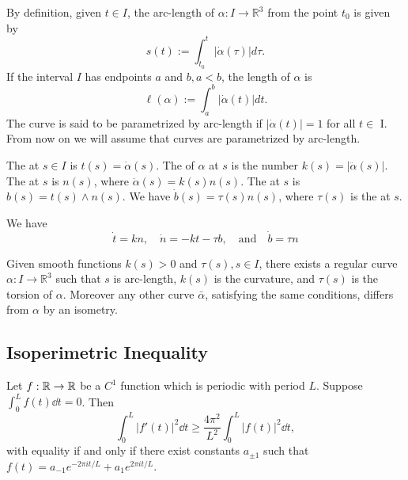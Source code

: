 \documentclass[10pt]{article}
\begin{document}
By definition, given $t \in I$, the arc-length of $\alpha: I \rightarrow \mathbb{R}^3$ from the point $t_0$ is given by
$$
s(t):=\int_{t_0}^t|\dot{\alpha}(\tau)| d \tau .
$$
If the interval $I$ has endpoints $a$ and $b, a<b$, the length of $\alpha$ is
$$
\ell(\alpha):=\int_a^b|\dot{\alpha}(t)| d t .
$$
The curve is said to be parametrized by arc-length if $|\dot{\alpha}(t)|=1$ for all $t \in$ I. From now on we will assume that curves are parametrized by arc-length.

\begin{definition}
    The  at $s\in I$ is $t(s) = \dot{\alpha}(s)$.
    The  of $\alpha$ at $s$ is the number $k(s)=|\ddot{\alpha}(s)|$. 
    The  at $s$ is $n(s)$, where $\ddot{\alpha}(s)=k(s) n(s)$. 
    The  at $s$ is $b(s) = t(s) \wedge n(s)$. We have $\dot{b}(s) = \tau(s) n(s)$, where $\tau(s)$ is the  at $s$.
\end{definition}

\begin{proposition}
    We have
    $$
\dot{t}  =k n, \quad 
\dot{n}  =-k t-\tau b, \quad \text{and} \quad
\dot{b}  =\tau n
$$
\end{proposition}

\begin{theorem}
    Given smooth functions $k(s)>0$ and $\tau(s), s \in I$, there exists a regular curve $\alpha: I \rightarrow \mathbb{R}^3$ such that $s$ is arc-length, $k(s)$ is the curvature, and $\tau(s)$ is the torsion of $\alpha$. Moreover any other curve $\bar{\alpha}$, satisfying the same conditions, differs from $\alpha$ by an isometry.
\end{theorem}

\subsection{Isoperimetric Inequality}

\begin{lemma}
    Let $f: \mathbb{R} \rightarrow \mathbb{R}$ be a $C^1$ function which is periodic with period $L$. Suppose $\int_0^L f(t) \dd t = 0$. Then
    $$
    \int_0^L |f'(t)|^2 \dd t \geq \frac{4 \pi ^2}{L^2} \int_0^L |f(t)|^2 \dd t,
    $$
    with equality if and only if there exist constants $a_{\pm 1}$ such that $f(t) = a_{-1} e^{-2 \pi i t/L} + a_1 e^{2 \pi i t/L}$.
\end{lemma}
\end{document}
